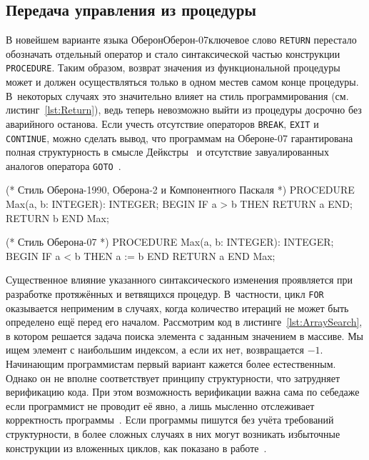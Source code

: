 \documentclass[utf8]{lgu}
\newcommand{\tire}{\unskip\nobreak\thinspace\textemdash\thinspace}
\newcommand{\code}[1]{{\normalsize\texttt{#1}}}
\begin{document}
\subsection{Передача управления из процедуры}

\label{sec:Oberon07Return}

\firstparskip В новейшем варианте языка Оберон\tire Оберон-07\tire ключевое слово \code{RETURN} перестало обозначать отдельный оператор и стало синтаксической частью конструкции \code{PROCEDURE}. Таким образом, возврат значения из функциональной процедуры может и должен осуществляться только в одном месте\tire в самом конце процедуры. В~некоторых случаях это значительно влияет на стиль программирования (см. листинг~\ref{lst:Return}), ведь теперь невозможно выйти из процедуры досрочно без аварийного останова. Если учесть отсутствие операторов \code{BREAK}, \code{EXIT} и \code{CONTINUE}, можно сделать вывод, что программам на Обероне-07 гарантирована полная структурность в смысле Дейкстры~\cite{Discip} и отсутствие завуалированных аналогов оператора \code{GOTO}~\cite{GoTo}.

\begin{listing}[H]
\caption{Запрет на RETURN в произвольном месте внутри процедуры}
\vspace{-17pt}
\label{lst:Return}
\begin{modula2}
(* Стиль Оберона-1990, Оберона‑2
   и Компонентного Паскаля *)
PROCEDURE Max(a, b: INTEGER): INTEGER;
BEGIN
  IF a > b THEN RETURN a END;
  RETURN b
END Max;

(* Стиль Оберона-07 *)
PROCEDURE Max(a, b: INTEGER): INTEGER;
BEGIN
  IF a < b THEN a := b END
RETURN a END Max;
\end{modula2}
\end{listing}

Существенное влияние указанного синтаксического изменения проявляется при разработке протяжённых и ветвящихся процедур. В~частности, цикл \code{FOR} оказывается неприменим в случаях, когда количество итераций не может быть определено ещё перед его началом. Рассмотрим код в листинге~\ref{lst:ArraySearch}, в котором решается задача поиска элемента с заданным значением в массиве. Мы ищем элемент с наибольшим индексом, а если их нет, возвращается $-1$. Начинающим программистам первый вариант кажется более естественным. Однако он не вполне соответствует принципу структурности, что затрудняет верификацию кода. При этом возможность верификации важна сама по себе\tire даже если программист не проводит её явно, а лишь мысленно отслеживает корректность программы~\cite[с.~33]{Lejno}. Если программы пишутся без учёта требований структурности, в более сложных случаях в них могут возникать избыточные конструкции из вложенных циклов, как показано в работе~\cite[разд.~2.5]{Ciruks}.
\end{document}
